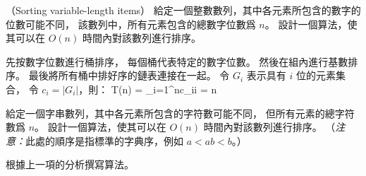 \startPROBLEM
（Sorting variable-length items）
\startigBase[a]\startitem
給定一個整數數列，其中各元素所包含的數字的位數可能不同，
該數列中，所有元素包含的總數字位數爲 $n$。
設計一個算法，使其可以在 $O(n)$ 時間內對該數列進行排序。
\stopitem\stopigBase

\startANSWER
先按數字位數進行桶排序，
每個桶代表特定的數字位數。
然後在組內進行基數排序。
最後將所有桶中排好序的鏈表連接在一起。
令 $G_i$ 表示具有 $i$ 位的元素集合，
令 $c_i=\left|G_i\right|$，則：
\startformula
T(n) = \sum_{i=1}^{n}c_i\cdot i = n
\stopformula
\stopANSWER

\startigBase[a,continue]\startitem
給定一個字串數列，其中各元素所包含的字符數可能不同，
但所有元素的總字符數爲 $n$。
設計一個算法，使其可以在 $O(n)$ 時間內對該數列進行排序。
（\emph{注意：}此處的順序是指標準的字典序，例如 $a<ab<b$。）
\stopitem\stopigBase

\startANSWER
根據上一項的分析撰寫算法。
\stopANSWER

\stopPROBLEM
